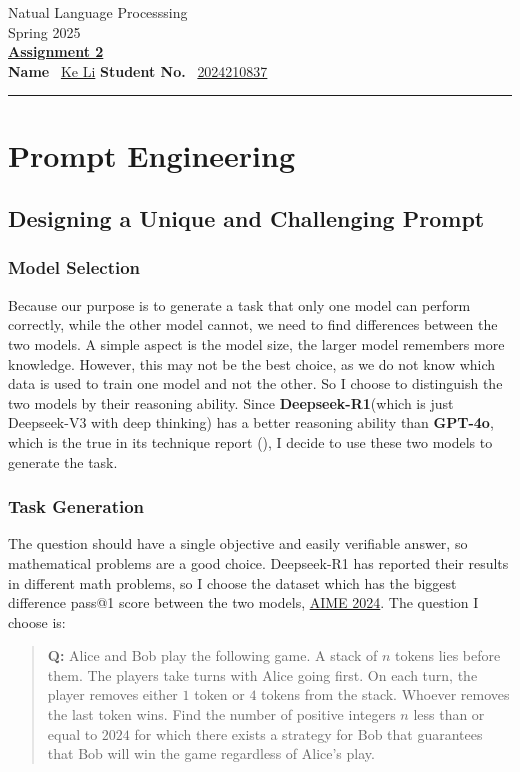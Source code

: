 \documentclass[a4paper,12pt]{article}
\begin{document}
\begin{center}
    Natual Language Processsing\\
    Spring 2025\\
    \vspace{0.25cm}
	\underline{\textbf{Assignment 2}}\\
    \vspace{0.5cm}
    \textbf{Name} \ \underline{Ke Li}  \hfill \textbf{Student No.} \ \underline{2024210837} \\
    \vspace{0.1cm}
\end{center}
\hrule
\vspace{0.2cm}

\section{Prompt Engineering}

\subsection{Designing a Unique and Challenging Prompt}
\subsubsection{Model Selection}

Because our purpose is to generate a task that only one model can perform correctly, while the other model cannot, we need to find differences between the two models. A simple aspect is the model size, the larger model remembers more knowledge. However, this may not be the best choice, as we do not know which data is used to train one model and not the other. So I choose to distinguish the two models by their reasoning ability. Since \textbf{Deepseek-R1}(which is just Deepseek-V3 with deep thinking) has a better reasoning ability than \textbf{GPT-4o}, which is the true in its technique report (\cite{deepseekai2025deepseekr1incentivizingreasoningcapability}), I decide to use these two models to generate the task.

\subsubsection{Task Generation}

The question should have a single objective and easily verifiable answer, so mathematical problems are a good choice. Deepseek-R1 has reported their results in different math problems, so I choose the dataset which has the biggest difference pass@1 score between the two models, \href{https://www.modelscope.cn/datasets/AI-ModelScope/AIME_2024/summary}{AIME 2024}. The question I choose is:
\begin{quote}
    \textbf{Q:} Alice and Bob play the following game. A stack of $n$ tokens lies before them. The players take turns with Alice going first. On each turn, the player removes either $1$ token or $4$ tokens from the stack. Whoever removes the last token wins. Find the number of positive integers $n$ less than or equal to $2024$ for which there exists a strategy for Bob that guarantees that Bob will win the game regardless of Alice's play.
\end{quote}
\end{document}
